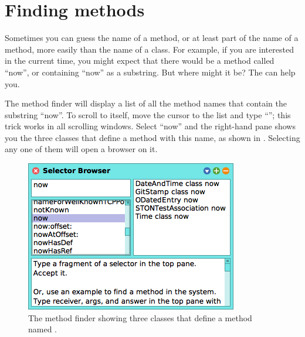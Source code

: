 \documentclass[a4paper,10pt,twoside]{book}
\begin{document}
\section{Finding methods}
\label{sec:quick:methodFinder}

Sometimes you can guess the name of a method, or at least part of the name of a method, more easily than the name of a class.  For example, if you are interested in the current time, you might expect that there would be a method called ``now'', or containing ``now'' as a substring.   But where might it be?
The  can help you.

The method finder will display a list of all the method names that contain the substring ``now''.  
To scroll to  itself, move the cursor to the list and type ``''; this trick works in all scrolling windows.  Select ``now'' and the right-hand pane shows you the three classes that define a method with this name, as shown in .  Selecting any one of them will open a browser on it.


\begin{figure}[hbt]
\centerline {\includegraphics[scale=0.6]{methodFinder-now}}
\caption{The method finder showing three classes that define a method named .
\label{fig:MethodFinder}}
\end{figure}
\end{document}
